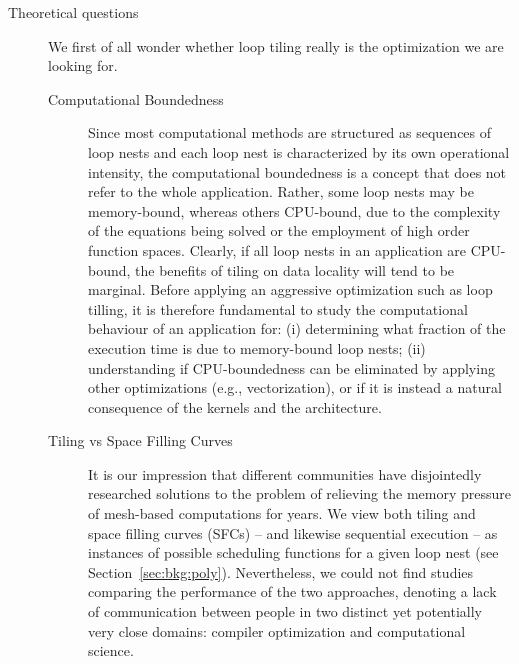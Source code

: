 \begin{description}
\item[Theoretical questions] We first of all wonder whether loop tiling really is the optimization we are looking for.
\begin{description}
\item[Computational Boundedness] Since most computational methods are structured as sequences of loop nests and each loop nest is characterized by its own operational intensity, the computational boundedness is a concept that does not refer to the whole application. Rather, some loop nests may be memory-bound, whereas others CPU-bound, due to the complexity of the equations being solved or the employment of high order function spaces. Clearly, if all loop nests in an application are CPU-bound, the benefits of tiling on data locality will tend to be marginal. Before applying an aggressive optimization such as loop tilling, it is therefore fundamental to study the computational behaviour of an application for: (i) determining what fraction of the execution time is due to memory-bound loop nests; (ii) understanding if CPU-boundedness can be eliminated by applying other optimizations (e.g., vectorization), or if it is instead a natural consequence of the kernels and the architecture.
\item[Tiling vs Space Filling Curves] It is our impression that different communities have disjointedly researched solutions to the problem of relieving the memory pressure of mesh-based computations for years. We view both tiling and space filling curves (SFCs) -- and likewise sequential execution -- as instances of possible scheduling functions for a given loop nest (see Section~\ref{sec:bkg:poly}). Nevertheless, we could not find studies comparing the performance of the two approaches, denoting a lack of communication between people in two distinct yet potentially very close domains: compiler optimization and computational science.

\end{description}


\end{description}
